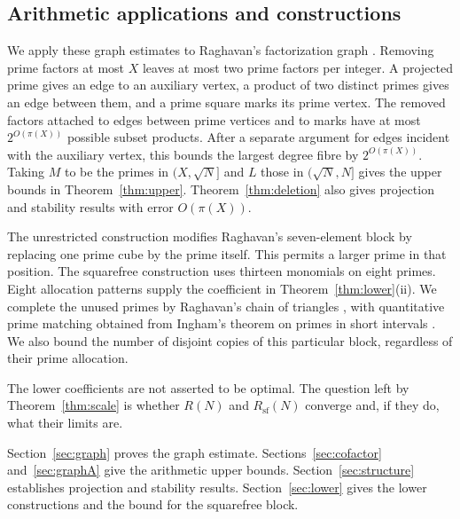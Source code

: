 \documentclass[11pt]{article}
\numberwithin{equation}{section}
\theoremstyle{remark}
\begin{document}
\subsection*{Arithmetic applications and constructions}
We apply these graph estimates to Raghavan's factorization graph \cite[Definition~2.4]{Raghavan}. Removing prime factors at most $X$ leaves at most two prime factors per integer. A projected prime gives an edge to an auxiliary vertex, a product of two distinct primes gives an edge between them, and a prime square marks its prime vertex. The removed factors attached to edges between prime vertices and to marks have at most $2^{O(\pi(X))}$ possible subset products. After a separate argument for edges incident with the auxiliary vertex, this bounds the largest degree fibre by $2^{O(\pi(X))}$. Taking $M$ to be the primes in $(X,\sqrt N]$ and $L$ those in $(\sqrt N,N]$ gives the upper bounds in Theorem~\ref{thm:upper}. Theorem~\ref{thm:deletion} also gives projection and stability results with error $O(\pi(X))$.

The unrestricted construction modifies Raghavan's seven-element block \cite[proof of Theorem~1.4]{Raghavan} by replacing one prime cube by the prime itself. This permits a larger prime in that position. The squarefree construction uses thirteen monomials on eight primes. Eight allocation patterns supply the coefficient in Theorem~\ref{thm:lower}(ii). We complete the unused primes by Raghavan's chain of triangles \cite[proof of Theorem~1.6]{Raghavan}, with quantitative prime matching obtained from Ingham's theorem on primes in short intervals \cite{Ingham}. We also bound the number of disjoint copies of this particular block, regardless of their prime allocation.

The lower coefficients are not asserted to be optimal. The question left by Theorem~\ref{thm:scale} is whether $R(N)$ and $R_{\mathrm{sf}}(N)$ converge and, if they do, what their limits are.

Section~\ref{sec:graph} proves the graph estimate. Sections~\ref{sec:cofactor} and~\ref{sec:graphA} give the arithmetic upper bounds. Section~\ref{sec:structure} establishes projection and stability results. Section~\ref{sec:lower} gives the lower constructions and the bound for the squarefree block.
\end{document}
